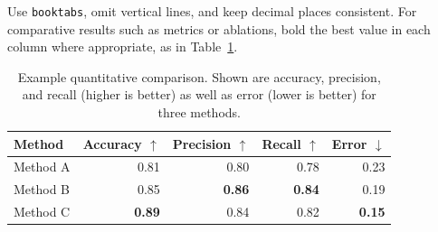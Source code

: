 
Use \texttt{booktabs}, omit vertical lines,
and keep decimal places consistent. For comparative results such as metrics or
ablations, bold the best value in each column where appropriate, as in
Table~\ref{tab:example-results}.

\begin{table}[b]
  \centering
  \begin{tabular}{lrrrr}
    \toprule
    Method & Accuracy $\uparrow$ & Precision $\uparrow$ & Recall $\uparrow$ & Error $\downarrow$ \\
    \midrule
    Method A & 0.81 & 0.80 & 0.78 & 0.23 \\
    Method B & 0.85 & \textbf{0.86} & \textbf{0.84} & 0.19 \\
    Method C & \textbf{0.89} & 0.84 & 0.82 & \textbf{0.15} \\
    \bottomrule
  \end{tabular}
  \caption{Example quantitative comparison. Shown are accuracy, precision, and recall (higher is better) as well as error (lower is better) for three methods.}
  \label{tab:example-results}
\end{table}
